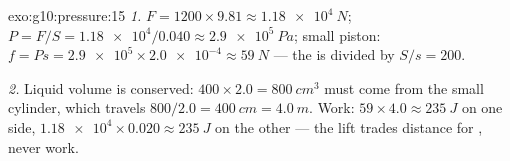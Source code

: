 \begin{solution}{exo:g10:pressure:15}
\emph{1.}  $F = 1200 \times 9.81 \approx \qty{1.18e4}{N}$;
 $P = F/S = \num{1.18e4}/0.040 \approx \qty{2.9e5}{Pa}$; small
piston: $f = P s = \num{2.9e5} \times \num{2.0e-4} \approx \qty{59}{N}$
--- the  is divided by $S/s = 200$.

\emph{2.} Liquid volume is conserved:
$400 \times 2.0 = \qty{800}{cm^3}$ must come from the small cylinder,
which travels $800/2.0 = \qty{400}{cm} = \qty{4.0}{m}$. Work:
$59 \times 4.0 \approx \qty{235}{J}$ on one side,
$\num{1.18e4} \times 0.020 \approx \qty{235}{J}$ on the other --- the
lift trades distance for , never work.
\end{solution}

